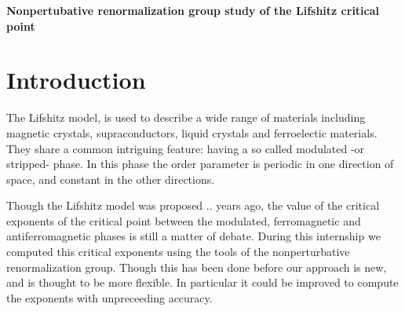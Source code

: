 %
%

\pagebreak

\begin{center}
\Huge \textbf{Nonpertubative renormalization group study of the Lifshitz critical point}
\end{center}


\section*{\Huge{Introduction}}

The Lifshitz model, is used to describe a wide range of materials including magnetic crystals, supraconductors, liquid crystals and ferroelectic materials. 
They share a common intriguing feature: having a so called modulated -or stripped- phase. In this phase the order parameter is periodic in one direction of space, and constant in the other directions. 

Though the Lifshitz model was proposed .. years ago, the value of the critical exponents of the critical point between the modulated, ferromagnetic and antiferromagnetic phases is still a matter of debate. During this internship we computed this critical exponents using the tools of the nonperturbative renormalization group. Though this has been done before \cite{MouhannaLif} \cite{BervillierLif} our approach is new, and is thought to be more flexible. In particular it could be improved to compute the exponents with unpreceeding accuracy.

